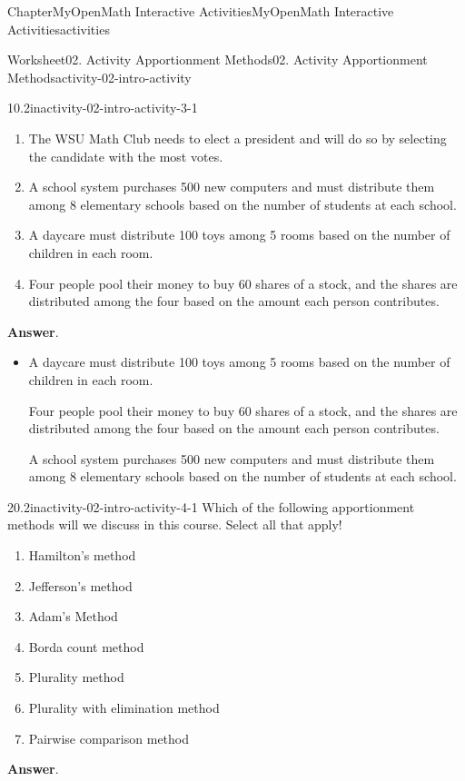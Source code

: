 \documentclass[oneside,10pt,]{book}
\newcommand{\blocktitlefont}{\relax}
\newcommand{\ptxlistdisc}{\raisebox{0.3ex}{\textbullet}}
\begin{document}
\begin{chapterptx}{Chapter}{MyOpenMath Interactive Activities}{}{MyOpenMath Interactive Activities}{}{}{activities}
\begin{worksheet-section}{Worksheet}{02. Activity Apportionment Methods}{}{02. Activity Apportionment Methods}{}{}{activity-02-intro-activity}
\begin{divisionexercise}{1}{}{0.2in}{activity-02-intro-activity-3-1}
\begin{enumerate}[label={(\alph*)}]
\item{}The WSU Math Club needs to elect a president and will do so by selecting the candidate with the most votes.%
\item{}A school system purchases 500 new computers and must distribute them among 8 elementary schools based on the number of students at each school.%
\item{}A daycare must distribute 100 toys among 5 rooms based on the number of children in each room.%
\item{}Four people pool their money to buy 60 shares of a stock, and the shares are distributed among the four based on the amount each person contributes.%
\end{enumerate}
%
\par\smallskip%
\noindent\textbf{\blocktitlefont Answer}.\hypertarget{activity-02-intro-activity-3-1-2}{}\quad{}%
\begin{itemize}[label=\ptxlistdisc]
\item{}A daycare must distribute 100 toys among 5 rooms based on the number of children in each room.%
\par
Four people pool their money to buy 60 shares of a stock, and the shares are distributed among the four based on the amount each person contributes.%
\par
A school system purchases 500 new computers and must distribute them among 8 elementary schools based on the number of students at each school.%
\end{itemize}
%
\end{divisionexercise}%
\clearpage
\begin{divisionexercise}{2}{}{0.2in}{activity-02-intro-activity-4-1}%
Which of the following apportionment methods will we discuss in this course. Select all that apply!%
\par
%
\begin{enumerate}[label={(\alph*)}]
\item{}Hamilton's method%
\item{}Jefferson's method%
\item{}Adam's Method%
\item{}Borda count method%
\item{}Plurality method%
\item{}Plurality with elimination method%
\item{}Pairwise comparison method%
\end{enumerate}
%
\par\smallskip%
\noindent\textbf{\blocktitlefont Answer}.\hypertarget{activity-02-intro-activity-4-1-2}{}\quad{}%

\end{divisionexercise}
\end{worksheet-section}
\end{chapterptx}
\end{document}
